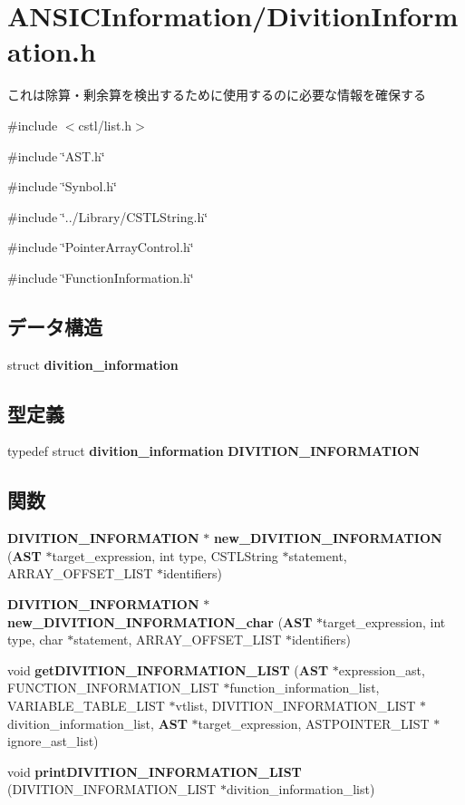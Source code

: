 \section{ANSICInformation/DivitionInformation.h}
\label{_divition_information_8h}


これは除算・剰余算を検出するために使用するのに必要な情報を確保する  


{\ttfamily \#include $<$cstl/list.h$>$}\par
{\ttfamily \#include \char`\"{}AST.h\char`\"{}}\par
{\ttfamily \#include \char`\"{}Synbol.h\char`\"{}}\par
{\ttfamily \#include \char`\"{}../Library/CSTLString.h\char`\"{}}\par
{\ttfamily \#include \char`\"{}PointerArrayControl.h\char`\"{}}\par
{\ttfamily \#include \char`\"{}FunctionInformation.h\char`\"{}}\par
\subsection*{データ構造}
\begin{DoxyCompactItemize}
\item 
struct {\bf divition\_\-information}
\end{DoxyCompactItemize}
\subsection*{型定義}
\begin{DoxyCompactItemize}
\item 
typedef struct {\bf divition\_\-information} {\bf DIVITION\_\-INFORMATION}
\end{DoxyCompactItemize}
\subsection*{関数}
\begin{DoxyCompactItemize}
\item 
{\bf DIVITION\_\-INFORMATION} $\ast$ {\bf new\_\-DIVITION\_\-INFORMATION} ({\bf AST} $\ast$target\_\-expression, int type, CSTLString $\ast$statement, ARRAY\_\-OFFSET\_\-LIST $\ast$identifiers)
\item 
{\bf DIVITION\_\-INFORMATION} $\ast$ {\bf new\_\-DIVITION\_\-INFORMATION\_\-char} ({\bf AST} $\ast$target\_\-expression, int type, char $\ast$statement, ARRAY\_\-OFFSET\_\-LIST $\ast$identifiers)
\item 
void {\bf getDIVITION\_\-INFORMATION\_\-LIST} ({\bf AST} $\ast$expression\_\-ast, FUNCTION\_\-INFORMATION\_\-LIST $\ast$function\_\-information\_\-list, VARIABLE\_\-TABLE\_\-LIST $\ast$vtlist, DIVITION\_\-INFORMATION\_\-LIST $\ast$divition\_\-information\_\-list, {\bf AST} $\ast$target\_\-expression, ASTPOINTER\_\-LIST $\ast$ignore\_\-ast\_\-list)
\item 
void {\bf printDIVITION\_\-INFORMATION\_\-LIST} (DIVITION\_\-INFORMATION\_\-LIST $\ast$divition\_\-information\_\-list)
\end{DoxyCompactItemize}


